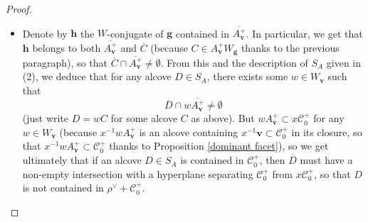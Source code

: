 \documentclass[11pt]{amsart}
\theoremstyle{plain}
\theoremstyle{remark}
\numberwithin{equation}{section}
\begin{document}
\begin{proof}
\begin{enumerate}
\begin{itemize}
				\begin{multline*}
					C=t_\mu(\omega_\mu u\omega_\mu^{-1})\mathbf{a}_1=t_\mu(\omega_\mu u\omega_\mu^{-1})t_{-\mu}t_\mu\mathbf{a}_1=(w_\mu u) (w_\mu^{-1}t_\mu)\mathbf{a}_1=(w_\mu u) \omega_\mu^{-1}\mathbf{a}_1\\=w_\mu u\mathbf{a}_1=A^+_\mathbf{v}u.
				\end{multline*}
				\item Denote by $\mathbf{h}$ the $W$-conjugate of $\mathbf{g}$ contained in $\overline{A^+_{\mathbf{v}}}$. In particular, we get that  $\mathbf{h}$ belongs to both $\overline{A^+_{\mathbf{v}}}$ and $\overline{C}$ (because $C\in A^+_\mathbf{v}W_\mathbf{g}$ thanks to the previous paragraph), so that $\overline{C}\cap\overline{A^+_{\mathbf{v}}}\neq\emptyset$. From this and the description of $S_A$ given in (2), we deduce that for any alcove $D\in S_A$, there exists some $w\in W_{\mathbf{v}}$ such that 
				$$\overline{D}\cap w\overline{A^+_{\mathbf{v}}}\neq\emptyset$$ 
				(just write $D=wC$ for some alcove $C$ as above). But $wA^+_{\mathbf{v}}\subset x\mathscr{C}^+_0$ for any $w\in W_{\mathbf{v}}$ (because $x^{-1}wA^+_{\mathbf{v}}$ is an alcove containing $x^{-1}\mathbf{v}\subset \mathscr{C}^+_0$ in its closure, so that $x^{-1}wA^+_{\mathbf{v}}\subset \mathscr{C}^+_0$ thanks to Proposition \ref{dominant facet}), so we get ultimately that if an alcove $D\in S_A$ is contained in $\mathscr{C}^+_0$, then $\overline{D}$ must have a non-empty intersection with a hyperplane separating $\mathscr{C}^+_0$ from $x\mathscr{C}^+_0$, so that $D$ is not contained in $\rho^\vee+\mathscr{C}^+_0$.
			\end{itemize} 
		\end{enumerate}
	\end{proof}
	
\end{document}
